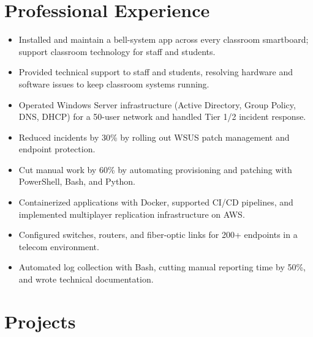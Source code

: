 \documentclass[a4paper,10pt]{article}
\begin{document}
\section*{Professional Experience}
\begin{itemize}
  \item Installed and maintain a bell-system app across every classroom smartboard; support classroom technology for staff and students.
\end{itemize}
\begin{itemize}
  \item Provided technical support to staff and students, resolving hardware and software issues to keep classroom systems running.
\end{itemize}
\begin{itemize}
  \item Operated Windows Server infrastructure (Active Directory, Group Policy, DNS, DHCP) for a 50-user network and handled Tier 1/2 incident response.
  \item Reduced incidents by 30\% by rolling out WSUS patch management and endpoint protection.
  \item Cut manual work by 60\% by automating provisioning and patching with PowerShell, Bash, and Python.
\end{itemize}
\begin{itemize}
  \item Containerized applications with Docker, supported CI/CD pipelines, and implemented multiplayer replication infrastructure on AWS.
\end{itemize}
\begin{itemize}
  \item Configured switches, routers, and fiber-optic links for 200+ endpoints in a telecom environment.
  \item Automated log collection with Bash, cutting manual reporting time by 50\%, and wrote technical documentation.
\end{itemize}

\section*{Projects}
\pOpenShift
\pAWSHA
\pKube
\pAWSNet
\pAWSHybrid
\end{document}
